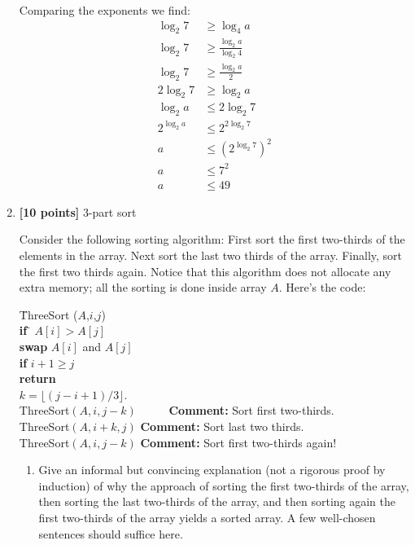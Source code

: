 \documentclass[11pt]{article}
\begin{document}
\begin{enumerate}
Comparing the exponents we find:
\begin{align*}
    \log_2 7 &\ge \log_4 a \\
    \log_2 7 &\ge \frac{\log_2 a}{\log_2 4} \\
    \log_2 7 &\ge \frac{\log_2 a}{2} \\
    2\log_2 7 &\ge \log_2 a \\
    \log_2 a &\le 2\log_2 7 \\
    2^{\log_2 a} &\le 2^{2\log_2 7} \\
    a &\le (2^{\log_2 7})^2 \\
    a &\le 7^2 \\
    a &\le 49
\end{align*}

\pagebreak
\item \textbf{[10 points]} 3-part sort 

Consider the following sorting algorithm: First sort the first
two-thirds of the elements in the array. Next sort the last two thirds of the array. Finally, sort the first two thirds again.  Notice that this algorithm does not allocate any extra memory; all the sorting is done inside array $A$.  Here's the code: 

\begin{tabbing}
\hspace*{1cm} \= ThreeSort ($A$,$i$,$j$) \\
\> \hspace*{.5cm} \= {\bf if} \= $A[i] > A[j]$ \\
\>\>\> {\bf swap} $A[i]$ and $A[j]$ \\
\>\> {\bf if} $i+1 \geq j$ \\
\>\>\> {\bf return} \\
\>\> $k = \lfloor (j-i+1)/3 \rfloor$. \\ 
\>\> ThreeSort$(A,i,j-k)$ \ \ \ \ \ \= {\bf Comment:} Sort first two-thirds. \\
\>\> ThreeSort$(A,i+k,j)$ \> {\bf Comment:} Sort last two thirds.\\            
\>\> ThreeSort$(A,i,j-k)$ \> {\bf Comment:} Sort first two-thirds again! \\     
\end{tabbing}

\begin{enumerate}
\item  Give an informal but convincing explanation (not a rigorous proof 
by induction) of why the 
		approach of sorting the first two-thirds of the array, 
then sorting the last two-thirds of the array,
		and then sorting again the first two-thirds of the 
array yields a sorted array.  A few well-chosen 				sentences should suffice here. 


\end{enumerate}
\end{enumerate}
\end{document}
